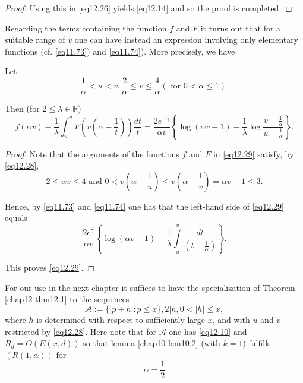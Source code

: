 \begin{proof}
Using this in \eqref{eq12.26} yields \eqref{eq12.14} and so the proof
is completed. 
\end{proof}


Regarding the terms containing the function $f$ and $F$ it turns out
that for a suitable range of $v$ one can have instead an expression
involving only elementary functions (cf. \eqref{eq11.73}) and
\eqref{eq11.74}). More precisely, we have 

\setcounter{lemma}{0}
\begin{lemma}\label{chap12-lem12.1}
Let
\begin{equation*}
\frac{1}{\alpha}<u<v,\frac{2}{\alpha}\leq v \leq \frac{4}{\alpha}
(\text{ for } 0 < \alpha \leq 1). \tag{12.28}\label{eq12.28} 
\end{equation*}

Then (for $2 \leq \lambda \in \mathbb{R}$)
\begin{equation*}
f(\alpha v)-\frac{1}{\lambda} \int_u^v F(v(\alpha -
\frac{1}{t}))\frac{dt}{t}=\frac{2e^{-\gamma}}{\alpha v}\left \{\log
(\alpha v-1)- \frac{1}{\lambda} \log
\frac{v-\frac{1}{\alpha}}{u-\frac{1}{\alpha}}\right\}. 
\tag{12.29}\label{eq12.29}  
\end{equation*}
\end{lemma}

\begin{proof}
Note that the arguments of the functions $f$ and $F$ in \eqref{eq12.29}
satisfy, by \eqref{eq12.28}, 
\begin{equation*}
2 \leq \alpha v \leq 4 \text{ and } 0<v(\alpha-\frac{1}{u})\leq
v(\alpha - \frac{1}{v})=\alpha v-1 \leq 3. \tag{12.30}\label{eq12.30} 
\end{equation*}

Hence, by \eqref{eq11.73} and \eqref{eq11.74} one has that the
left-hand side of \eqref{eq12.29} equals 
\begin{equation*}
\frac{2e^{\gamma}}{\alpha v}\left \{\log (\alpha
v-1)-\frac{1}{\lambda} \int\limits_u^v \frac{dt}{(t-\frac{1}{\alpha})}
\right \}. \tag{12.31}\label{eq12.31} 
\end{equation*}\pageoriginale

This proves \eqref{eq12.29}.
\end{proof}

For our use in the next chapter it suffices to have the specialization
of Theorem \ref{chap12-thm12.1} to the sequences 
\begin{equation*}
\mathscr{A}:=\{|p+h|:p \leq x \}, 2|h,0 < |h| \leq x,
\tag{12.32}\label{eq12.32} 
\end{equation*}
where $h$ is determined with respect to sufficiently large $x$, and
with $u$ and $v$ restricted by \eqref{eq12.28}. Here note that for
$\mathscr{A}$ one has \eqref{eq12.10} and $R_d=O(E(x,d))$ so that lemma
\ref{chap10-lem10.2} (with $k=1$) fulfills $(R(1, \alpha))$ for 
\begin{equation*}
\alpha=\frac{1}{2} \tag{12.33}\label{eq12.33}
\end{equation*}

